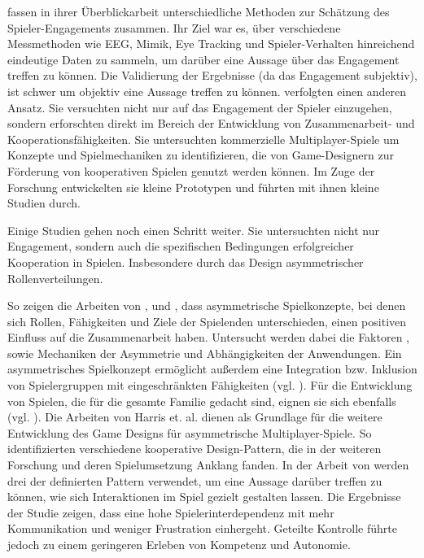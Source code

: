 \cite{rashed_review_2025} fassen in ihrer Überblickarbeit unterschiedliche Methoden zur Schätzung des Spieler-Engagements zusammen. Ihr Ziel war es, über verschiedene Messmethoden wie EEG, Mimik, Eye Tracking und Spieler-Verhalten hinreichend eindeutige Daten zu sammeln, um darüber eine Aussage über das Engagement treffen zu können. Die Validierung der Ergebnisse (da das Engagement subjektiv), ist schwer um objektiv eine  Aussage treffen zu können. \cite{hainan_yu_video_2023} verfolgten einen anderen Ansatz. Sie versuchten nicht nur auf das Engagement der Spieler einzugehen, sondern erforschten direkt im Bereich der Entwicklung von Zusammenarbeit- und Kooperationsfähigkeiten. Sie untersuchten kommerzielle Multiplayer-Spiele um Konzepte und Spielmechaniken zu identifizieren, die von Game-Designern zur Förderung von kooperativen Spielen genutzt werden können. Im Zuge der Forschung entwickelten sie kleine Prototypen und führten mit ihnen kleine Studien durch. 

Einige Studien gehen noch einen Schritt weiter. Sie untersuchten nicht nur Engagement, sondern auch die spezifischen Bedingungen erfolgreicher Kooperation in Spielen. Insbesondere durch das Design asymmetrischer Rollenverteilungen.

So zeigen die Arbeiten von \cite{harris_beam_2014}, \cite{harris_leveraging_2016} und \cite{harris_asymmetry_2019}, dass asymmetrische Spielkonzepte, bei denen sich Rollen, Fähigkeiten und Ziele der Spielenden unterschieden, einen positiven Einfluss auf die Zusammenarbeit haben. Untersucht werden dabei die Faktoren ,  sowie Mechaniken der Asymmetrie und Abhängigkeiten der Anwendungen. Ein asymmetrisches Spielkonzept ermöglicht außerdem eine Integration bzw. Inklusion von Spielergruppen mit eingeschränkten Fähigkeiten (vgl. \citealp{goncalves_exploring_2021}). Für die Entwicklung von Spielen, die für die gesamte Familie gedacht sind, eignen sie sich ebenfalls (vgl. \citealp{pais_promoting_2024}).
Die Arbeiten von Harris et. al. dienen als Grundlage für die weitere Entwicklung des Game Designs für asymmetrische Multiplayer-Spiele. So identifizierten \cite{rocha_game_2008} verschiedene kooperative Design-Pattern, die in der weiteren Forschung und deren Spielumsetzung Anklang fanden. In der Arbeit von \cite{emmerich_impact_2017} werden drei der definierten Pattern verwendet, um eine Aussage darüber treffen zu können, wie sich Interaktionen im Spiel gezielt gestalten lassen. Die Ergebnisse der Studie zeigen, dass eine hohe Spielerinterdependenz mit mehr Kommunikation und weniger Frustration einhergeht. Geteilte Kontrolle führte jedoch zu einem geringeren Erleben von Kompetenz und Autonomie.

